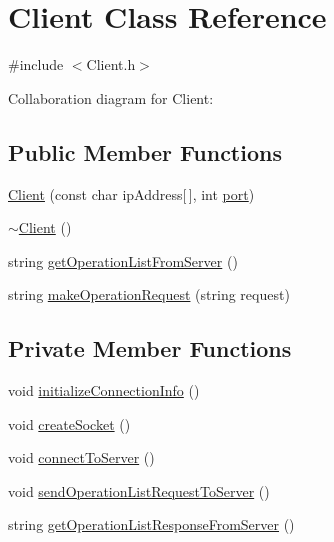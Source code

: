 \hypertarget{classClient}{}\section{Client Class Reference}
\label{classClient}


{\ttfamily \#include $<$Client.\+h$>$}



Collaboration diagram for Client\+:
\subsection*{Public Member Functions}
\begin{DoxyCompactItemize}
\item 
\mbox{\hyperlink{classClient_a0c36ffb481052708297b939e8e8987e6}{Client}} (const char ip\+Address\mbox{[}$\,$\mbox{]}, int \mbox{\hyperlink{classClient_aad8864d1362eae7c50e53c0d131b7442}{port}})
\item 
\mbox{\hyperlink{classClient_a840e519ca781888cbd54181572ebe3a7}{$\sim$\+Client}} ()
\item 
string \mbox{\hyperlink{classClient_af0e814ffbcec066870a0f9d06aab1c80}{get\+Operation\+List\+From\+Server}} ()
\item 
string \mbox{\hyperlink{classClient_a4b3fb068e167dae862670c1c71c8bf4f}{make\+Operation\+Request}} (string request)
\end{DoxyCompactItemize}
\subsection*{Private Member Functions}
\begin{DoxyCompactItemize}
\item 
void \mbox{\hyperlink{classClient_a19174bbc66616854e59df496419e97e8}{initialize\+Connection\+Info}} ()
\item 
void \mbox{\hyperlink{classClient_a76e843ac6155814b72b5b07d50c0d42e}{create\+Socket}} ()
\item 
void \mbox{\hyperlink{classClient_a484b660517d6a610b6733bee7e96cb8c}{connect\+To\+Server}} ()
\item 
void \mbox{\hyperlink{classClient_a0ebe2a9ba72088ed1863a6d3eb3729bf}{send\+Operation\+List\+Request\+To\+Server}} ()
\item 
string \mbox{\hyperlink{classClient_ad35a8d75c474438e4badb63a203b9b47}{get\+Operation\+List\+Response\+From\+Server}} ()
\end{DoxyCompactItemize}
